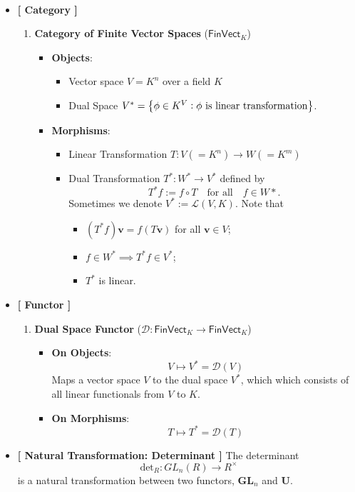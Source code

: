 \begin{example}
\ \begin{itemize}
	\item[] \textbf{[ Category ]}
	\begin{enumerate}
		\item \textbf{Category of Finite Vector Spaces} ($\mathsf{FinVect}_K$)
		\begin{itemize}
			\item \textbf{Objects}: 
			\begin{itemize}
				\item Vector space $V=K^n$ over a field $K$
				\item Dual Space $V^*=\set{\phi\in K^{V}:\phi\ \text{is linear transformation}}$.
			\end{itemize}
			\item \textbf{Morphisms}:  
			\begin{itemize}
				\item Linear Transformation $T:V(=K^n)\to W(=K^m)$
				\item Dual Transformation $T^*:W^*\to V^*$ defined by \[
				T^*f:=f\circ T\quad\text{for all}\quad f\in W*.
				\] Sometimes we denote $V^*:=\mathcal{L}(V,K)$. Note that \begin{itemize}
					\item $(T^*f)\textbf{v}=f(T\textbf{v})$ for all $\textbf{v}\in V$;
					\item $f\in W^*\implies T^*f\in V^*$;
					\item $T^*$ is linear.
				\end{itemize}
			\end{itemize}
		\end{itemize}
	\end{enumerate}
	\item[] \textbf{[ Functor ]}
	\begin{enumerate}
		\item \textbf{Dual Space Functor} ($\mathcal{D}:\mathsf{FinVect}_K\to\mathsf{FinVect}_K$)
		\begin{itemize}
			\item \textbf{On Objects}: \[
			V\mapsto V^*=\mathcal{D}(V)
			\] Maps a vector space $V$ to the dual space $V^*$, which  which consists of all linear functionals from $V$ to $K$.
			\item \textbf{On Morphisms}:\[
			T\mapsto T^*=\mathcal{D}(T)
			\]
		\end{itemize}
	\end{enumerate}
	\item \textbf{[ Natural Transformation: Determinant ]} The determinant \[
	\text{det}_R:GL_n(R)\to R^{\times}
	\] is a natural transformation between two functors, $\mathbf{GL}_n$ and $\mathbf{U}$.
\end{itemize}
\end{example}

